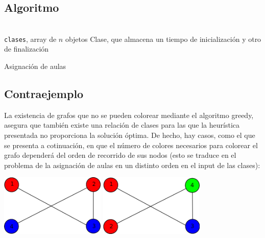 \documentclass[a4paper, 11pt]{article} %
\let\emptyset\varnothing
\begin{document}
  \subsection{Algoritmo}
\begin{algorithm}[H]
	\begin{algorithmic}[1]
		\REQUIRE \ \\
        	\texttt{clases}, array de $n$ objetos Clase, que almacena
				 un tiempo de inicialización y otro de 
				 finalización\\
	  \WHILE{\texttt{sin\_colorear}$\neq \emptyset$}
	      \ENDIF
	    \ENDFOR
	    
	  \ENDWHILE
	\end{algorithmic}
    \caption{Asignación de aulas}
    \label{aulas}
\end{algorithm}


\subsection{Contraejemplo}
La existencia de grafos que no se pueden colorear mediante el algoritmo greedy, asegura que también existe una relación de clases para
las que la heurística presentada no proporciona la solución óptima. De hecho, hay casos, como el que se presenta a cotinuación,
en que el número de colores necesarios para colorear el grafo dependerá del orden de recorrido de sus nodos (esto se traduce en
el problema de la asignación de aulas en un distinto orden en el input de las clases):

     \begin{center}
	\includegraphics[width=5cm]{ej51.png}
	\includegraphics[width=5cm]{ej52.png}
     \end{center}  
     
\end{document}
